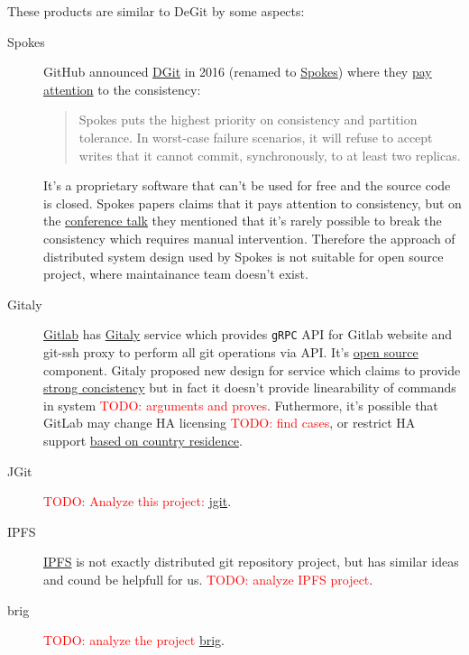 \documentclass[12pt,oneside]{article}
\newcommand{\code}[1]{\texttt{#1}}
\newcommand{\todo}[1]{\textcolor{red}{TODO: #1}}
\begin{document}
These products are similar to DeGit by some aspects:
\begin{description}
  \item[Spokes]
    GitHub announced \href{https://github.blog/2016-04-05-introducing-dgit/}{DGit}
    in 2016 (renamed to \href{https://github.blog/2016-09-07-building-resilience-in-spokes/}{Spokes})
    where they \href{https://github.blog/2016-09-07-building-resilience-in-spokes/#defining-resilience}{pay attention}
    to the consistency:
    \begin{quote}
      Spokes puts the highest priority on consistency and partition tolerance.
      In worst-case failure scenarios, it will refuse to accept writes that it cannot commit,
      synchronously, to at least two replicas.
    \end{quote}
    It's a proprietary software that can't be used for free and the source code is closed.
    Spokes papers claims that it pays attention to consistency, but on the
    \href{https://www.youtube.com/watch?v=DY0yNRNkYb0}{conference talk} they mentioned that
    it's rarely possible to break the consistency which requires manual intervention.
    Therefore the approach of distributed system design used by Spokes is not suitable for open
    source project, where maintainance team doesn't exist.
  \item[Gitaly]
    \href{https://docs.gitlab.com/ee/README.html}{Gitlab} has
    \href{https://docs.gitlab.com/ee/administration/gitaly/}{Gitaly} service which provides
    \code{gRPC} API for Gitlab website and git-ssh proxy to perform all git operations via API.
    It's \href{https://gitlab.com/gitlab-org/gitaly}{open source} component.
    Gitaly proposed new design for service which claims to provide
    \href{https://gitlab.com/gitlab-org/gitaly/-/blob/master/doc/design\_ha.md\#strong-consistency-design}{strong concistency}
    but in fact it doesn't provide linearability of commands in system \todo{arguments and proves}.
    Futhermore, it's possible that GitLab may change HA licensing \todo{find cases},
    or restrict HA support \href{https://news.ycombinator.com/item?id=21437334}{based on country residence}.
  \item[JGit]
    \todo{Analyze this project:}
    \href{https://www.eclipse.org/jgit/}{jgit}.
  \item[IPFS]
    \href{https://ipfs.io/}{IPFS} is not exactly distributed git repository project, but has similar ideas
    and cound be helpfull for us. \todo{analyze IPFS project}.
  \item[brig]
    \todo{analyze the project} \href{https://github.com/sahib/brig}{brig}.
\end{description}
\end{document}
